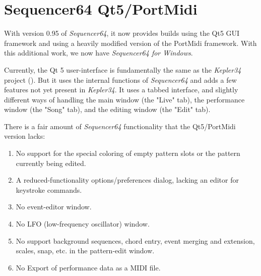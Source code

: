 %
%
%

\section{Sequencer64 Qt5/PortMidi}
\label{sec:qt_portmidi}

   With version 0.95 of \textsl{Sequencer64}, it now provides builds using the
   Qt5 GUI framework and using a heavily modified version of the PortMidi
   framework.
   With this additional work, we now have
   \textsl{Sequencer64 for Windows}.

   Currently, the Qt 5 user-interface is fundamentally the same as
   the \textsl{Kepler34} project (\cite{kepler34}).
   But it uses the internal functions of \textsl{Sequencer64} and adds a few
   features not yet present in \textsl{Kepler34}.
   It uses a tabbed interface, and slightly different ways of handling the main
   window (the "Live" tab), the performance window (the "Song" tab), and the
   editing window (the "Edit" tab).

   There is a fair amount of \textsl{Sequencer64} functionality that the
   Qt5/PortMidi version lacks:

   \begin{enumerate}
      \item No support for the special coloring of empty pattern slots
         or the pattern currently being edited.
      \item A reduced-functionality options/preferences dialog, lacking an
         editor for keystroke commands.
      \item No event-editor window.
      \item No LFO (low-frequency oscillator) window.
      \item No support background sequences, chord entry, event merging and
         extension, scales, snap, etc. in the pattern-edit window.
      \item No Export of performance data as a MIDI file.
   \end{enumerate}

